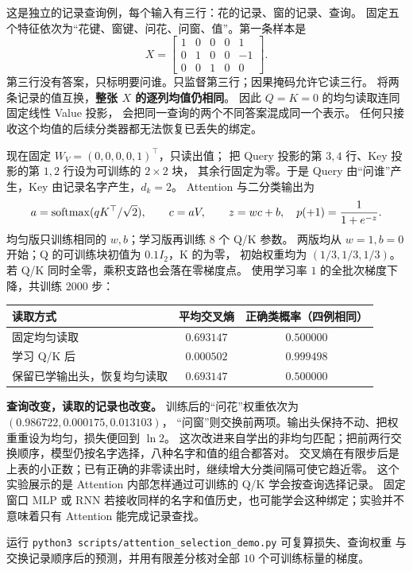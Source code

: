 这是独立的记录查询例，每个输入有三行：花的记录、窗的记录、查询。
固定五个特征依次为“花键、窗键、问花、问窗、值”。第一条样本是
\[
X=\begin{bmatrix}1&0&0&0&1\\0&1&0&0&-1\\0&0&1&0&0\end{bmatrix}.
\]
第三行没有答案，只标明要问谁。只监督第三行；因果掩码允许它读三行。
将两条记录的值互换，\textbf{整张 $X$ 的逐列均值仍相同}。
因此 $Q=K=0$ 的均匀读取连同固定线性 Value 投影，
会把同一查询的两个不同答案混成同一个表示。
任何只接收这个均值的后续分类器都无法恢复已丢失的绑定。

现在固定 $W_V=(0,0,0,0,1)^\top$，只读出值；
把 Query 投影的第 $3,4$ 行、Key 投影的第 $1,2$ 行设为可训练的 $2\times2$ 块，
其余行固定为零。于是 Query 由“问谁”产生，Key 由记录名字产生，$d_k=2$。
Attention 与二分类输出为
\[
a=\operatorname{softmax}(qK^\top/\sqrt2),\qquad c=aV,\qquad
z=wc+b,\quad p(+1)=\frac{1}{1+e^{-z}}.
\]
均匀版只训练相同的 $w,b$；学习版再训练 $8$ 个 Q/K 参数。
两版均从 $w=1,b=0$ 开始；Q 的可训练块初值为 $0.1I_2$，K 的为零，
初始权重均为 $(1/3,1/3,1/3)$。若 Q/K 同时全零，乘积支路也会落在零梯度点。
使用学习率 $1$ 的全批次梯度下降，共训练 $2000$ 步：
\begin{center}\small
{}
\begin{tabular}{@{}lcc@{}}\toprule
读取方式 & 平均交叉熵 & 正确类概率（四例相同）\\\midrule
固定均匀读取 & $0.693147$ & $0.500000$\\
学习 Q/K 后 & $0.000502$ & $0.999498$\\
保留已学输出头，恢复均匀读取 & $0.693147$ & $0.500000$\\\bottomrule
\end{tabular}
\end{center}

\par\smallskip
\textbf{查询改变，读取的记录也改变。}
训练后的“问花”权重依次为 $(0.986722,0.000175,0.013103)$，
“问窗”则交换前两项。输出头保持不动、把权重重设为均匀，损失便回到 $\ln2$。
这次改进来自学出的非均匀匹配；把前两行交换顺序，模型仍按名字选择，八种名字和值的组合都答对。
交叉熵在有限步后是上表的小正数；已有正确的非零读出时，继续增大分类间隔可使它趋近零。
这个实验展示的是 Attention 内部怎样通过可训练的 Q/K 学会按查询选择记录。
固定窗口 MLP 或 RNN 若接收同样的名字和值历史，也可能学会这种绑定；实验并不意味着只有 Attention 能完成记录查找。

运行 \texttt{python3 scripts/attention\_selection\_demo.py} 可复算损失、查询权重
与交换记录顺序后的预测，并用有限差分核对全部 $10$ 个可训练标量的梯度。

